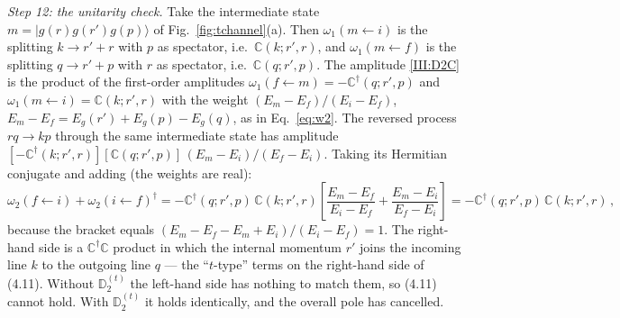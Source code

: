 \emph{Step 12: the unitarity check.} Take the intermediate state $m=|g(r)g(r')g(p)\rangle$ of Fig.~\ref{fig:tchannel}(a). Then $\omega_1(m\!\leftarrow\! i)$ is the splitting $k\to r'+r$ with $p$ as spectator, i.e.\ $\mathbb C(k;r',r)$, and $\omega_1(m\!\leftarrow\! f)$ is the splitting $q\to r'+p$ with $r$ as spectator, i.e.\ $\mathbb C(q;r',p)$. The amplitude \eqref{III:D2C} is the product of the first-order amplitudes $\omega_1(f\!\leftarrow\! m)=-\mathbb C^\dagger(q;r',p)$ and $\omega_1(m\!\leftarrow\! i)=\mathbb C(k;r',r)$ with the weight $(E_m-E_f)/(E_i-E_f)$, $E_m-E_f=E_g(r')+E_g(p)-E_g(q)$, as in Eq.~\eqref{eq:w2}. The reversed process $rq\to kp$ through the same intermediate state has amplitude $[-\mathbb C^\dagger(k;r',r)][\mathbb C(q;r',p)]\,(E_m-E_i)/(E_f-E_i)$. Taking its Hermitian conjugate and adding (the weights are real):
\begin{equation}
\omega_2(f\!\leftarrow\! i)+\omega_2(i\!\leftarrow\! f)^\dagger=-\mathbb C^\dagger(q;r',p)\,\mathbb C(k;r',r)\left[\frac{E_m-E_f}{E_i-E_f}+\frac{E_m-E_i}{E_f-E_i}\right]=-\mathbb C^\dagger(q;r',p)\,\mathbb C(k;r',r)\,,
\label{III:unitcheck}
\end{equation}
because the bracket equals $(E_m-E_f-E_m+E_i)/(E_i-E_f)=1$. The right-hand side is a $\mathbb C^\dagger\mathbb C$ product in which the internal momentum $r'$ joins the incoming line $k$ to the outgoing line $q$ --- the ``$t$-type'' terms on the right-hand side of (4.11). Without $\mathbb D_2^{(t)}$ the left-hand side has nothing to match them, so (4.11) cannot hold. With $\mathbb D_2^{(t)}$ it holds identically, and the overall pole has cancelled.

